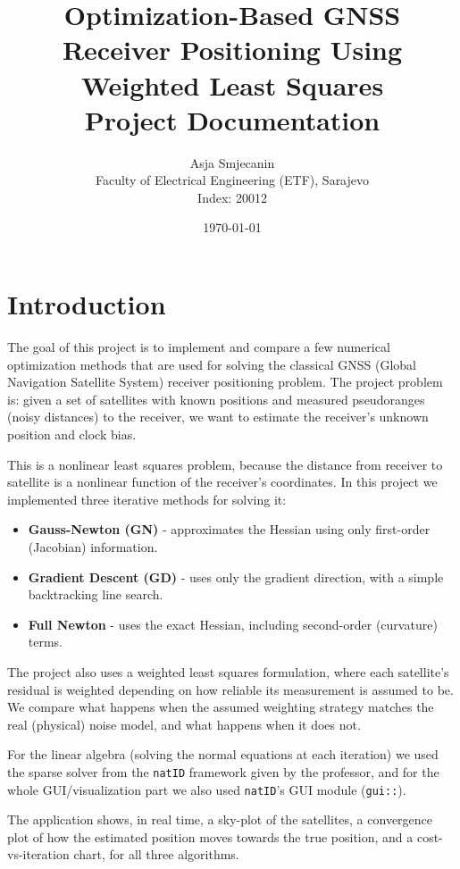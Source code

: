 \documentclass[11pt]{article}
\title{Optimization-Based GNSS Receiver Positioning Using Weighted Least Squares \\ \large Project Documentation}
\author{Asja Smjecanin \\ Faculty of Electrical Engineering (ETF), Sarajevo \\ Index: 20012}
\date{\today}
\begin{document}
\maketitle

\section{Introduction}

The goal of this project is to implement and compare a few numerical optimization methods that are used for solving the classical GNSS (Global Navigation Satellite System) receiver positioning problem. The project problem is: given a set of satellites with known positions and measured pseudoranges (noisy distances) to the receiver, we want to estimate the receiver's unknown position and clock bias.

This is a nonlinear least squares problem, because the distance from receiver to satellite is a nonlinear function of the receiver's coordinates. In this project we implemented three iterative methods for solving it:

\begin{itemize}
    \item \textbf{Gauss-Newton (GN)} - approximates the Hessian using only first-order (Jacobian) information.
    \item \textbf{Gradient Descent (GD)} - uses only the gradient direction, with a simple backtracking line search.
    \item \textbf{Full Newton} - uses the exact Hessian, including second-order (curvature) terms.
\end{itemize}

The project also uses a weighted least squares formulation, where each satellite's residual is weighted depending on how reliable its measurement is assumed to be. We compare what happens when the assumed weighting strategy matches the real (physical) noise model, and what happens when it does not.

For the linear algebra (solving the normal equations at each iteration) we used the sparse solver from the \texttt{natID} framework given by the professor, and for the whole GUI/visualization part we also used \texttt{natID}'s GUI module (\texttt{gui::}).

The application shows, in real time, a sky-plot of the satellites, a convergence plot of how the estimated position moves towards the true position, and a cost-vs-iteration chart, for all three algorithms.
\end{document}
